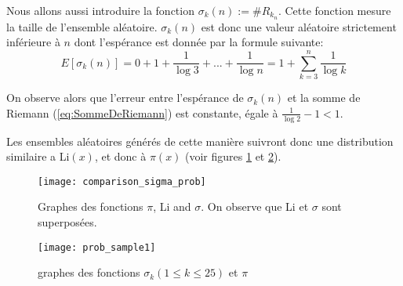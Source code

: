 \documentclass[../main.tex]{report}
\begin{document}
Nous allons aussi introduire la fonction $\sigma_k(n) := \# R_{k_n}$. Cette fonction mesure la taille de l'ensemble aléatoire.\newline
$\sigma_k(n)$ est donc une valeur aléatoire strictement inférieure à $n$ dont l'espérance est donnée par la formule suivante:
\begin{equation}
\label{eq:esperance}
E[\sigma_k(n)] = 0 + 1 + \frac{1}{\log 3} + ... + \frac{1}{\log n}
= 1 + \sum_{k=3}^{n} \frac{1}{\log k}
\end{equation}

On observe alors que l'erreur entre l'espérance de $\sigma_k(n)$ et la somme de Riemann (\ref{eq:SommeDeRiemann}) est constante, égale à
$\frac{1}{\log 2}- 1 < 1$.

Les ensembles aléatoires générés de cette manière suivront donc une distribution similaire a Li$(x)$, et donc à $\pi(x)$
(voir figures \ref{fig:comparison_sigma_prob} et \ref{fig:prob_sample}).

\begin{figure}[H]
\texttt{[image: comparison\_sigma\_prob]}

\caption{Graphes des fonctions $\pi$, Li and $\sigma$. On observe que Li et $\sigma$ sont superposées.}
\label{fig:comparison_sigma_prob}
\end{figure}

\begin{figure}[H]
	\texttt{[image: prob\_sample1]}
	\caption{graphes des fonctions $\sigma_k (1 \leq k \leq 25)$ et $\pi$}
	\label{fig:prob_sample}
\end{figure}

\clearpage
\end{document}
